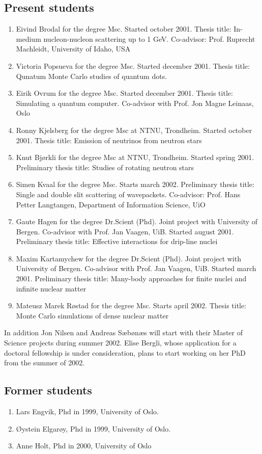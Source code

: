 \subsection*{Present students}
\begin{enumerate}
\item  
   Eivind Brodal for the degree Msc. Started  october 2001.
            Thesis title: In-medium nucleon-nucleon scattering up to
            1 GeV. Co-advisor: Prof. Ruprecht Machleidt, University of
            Idaho, USA
      \item   Victoria Popsueva for the degree Msc. Started  december 2001.
            Thesis title: Qunatum Monte Carlo studies of quantum dots.
      \item    Eirik Ovrum for the degree Msc. Started  december 2001.
            Thesis title: Simulating a quantum computer.
            Co-advisor with Prof. Jon Magne Leinaas, Oslo
      \item    Ronny Kjelsberg for the degree Msc at NTNU, Trondheim.
            Started  october 2001. 
            Thesis title: Emission of neutrinos from neutron stars
      \item    Knut Bj\o rkli for the degree Msc at NTNU, Trondheim.
            Started  spring 2001.
            Preliminary thesis title: Studies of rotating neutron stars
      \item   Simen Kvaal for the degree Msc.
            Starts march 2002.
            Preliminary thesis title: Single and double slit
            scattering of wavepackets. Co-advisor: Prof. Hans Petter Langtangen,
            Department of Information Science, UiO
      \item   Gaute Hagen for the degree Dr.Scient (Phd). Joint project with
            University of Bergen. Co-advisor with Prof. Jan Vaagen, UiB.
            Started  august 2001.
            Preliminary thesis title: Effective interactions for drip-line nuclei
      \item    Maxim Kartamychew for the degree Dr.Scient (Phd). Joint project with
            University of Bergen. Co-advisor with Prof. Jan Vaagen, UiB.
            Started  march 2001.
            Preliminary thesis title: Many-body approaches for finite nuclei and infinite
            nuclear matter
\item      Mateusz Marek R\o stad for the degree Msc. Starts  april 2002.
            Thesis title: Monte Carlo simulations of dense nuclear matter
\end{enumerate}
In addition Jon Nilsen and Andreas S\ae b\o n\ae s will start with their
Master of Science projects during summer 2002.
Elise Bergli, whose application for a doctoral fellowship is under consideration, plans to start working on her PhD from the summer of 2002.
\subsection*{Former students}
\begin{enumerate}
\item Lars Engvik, Phd in 1999, University of Oslo. 
\item \O ystein Elgar\o y, Phd in 1999, University of Oslo.
\item Anne Holt, Phd in 2000, University of Oslo 
\end{enumerate}








